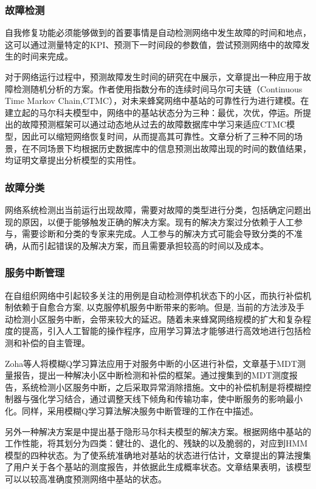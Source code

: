 ﻿\documentclass[11pt,draftclsnofoot,onecolumn,journal,letterpaper]{IEEEtran}
\begin{document}
\subsubsection{故障检测}
自我修复功能必须能够做到的首要事情是自动检测网络中发生故障的时间和地点，这可以通过测量特定的KPI、预测下一时间段的参数值，尝试预测网络中的故障发生的时间来完成。

对于网络运行过程中，预测故障发生时间的研究在\cite{Farooq2015}中展示，文章提出一种应用于故障检测随机分析的方案。作者使用指数分布的连续时间马尔可夫链（Continuous Time Markov Chain,CTMC），对未来蜂窝网络中基站的可靠性行为进行建模。在建立起的马尔科夫模型中，网络中的基站状态分为三种：最优，次优，停运。所提出的故障预测框架可以通过动态地从过去的故障数据库中学习来适应CTMC模型，因此可以缩短网络恢复时间，从而提高其可靠性。文章分析了三种不同的场景，在不同场景下均根据历史数据库中的信息预测出故障出现的时间的数值结果，均证明文章提出分析模型的实用性。

\subsubsection{故障分类}

网络系统检测出当前运行出现故障，需要对故障的类型进行分类，包括确定问题出现的原因，以便于能够触发正确的解决方案。现有的解决方案过分依赖于人工参与，需要诊断和分类的专家来完成。人工参与的解决方式可能会导致分类的不准确，从而引起错误的及解决方案，而且需要承担较高的时间以及成本。


\subsubsection{服务中断管理}

在自组织网络中引起较多关注的用例是自动检测停机状态下的小区，而执行补偿机制依赖于自愈合方案, 以克服停机服务中断带来的影响。但是, 当前的方法涉及手动检测小区服务中断，会带来较大的延迟。随着未来蜂窝网络规模的扩大和复杂程度的提高，引入人工智能的操作程序，应用学习算法才能够进行高效地进行包括检测和补偿的自主管理。

Zoha等人\cite{Zoha2016}将模糊Q学习算法应用于对服务中断的小区进行补偿，文章基于MDT测量报告，提出一种解决小区中断检测和补偿的框架。通过搜集到的MDT测度报告，系统检测小区服务中断，之后采取异常消除措施。文中的补偿机制是将模糊控制器与强化学习结合，通过调整天线下倾角和传输功率，使中断服务的影响最小化。同样，采用模糊Q学习算法解决服务中断管理的工作在\cite{Razavi2010}\cite{Razavi2010a}\cite{Islam2012}中描述。

另外一种解决方案是\cite{Alias2016}中提出基于隐形马尔科夫模型的解决方案。根据网络中基站的工作性能，将其划分为四类：健壮的、退化的、残缺的以及脆弱的，对应到HMM模型的四种状态。为了使系统准确地对基站的状态进行估计，文章提出的算法搜集了用户关于各个基站的测度报告，并依据此生成概率状态。文章结果表明，该模型可以以较高准确度预测网络中基站的状态。
\end{document}
